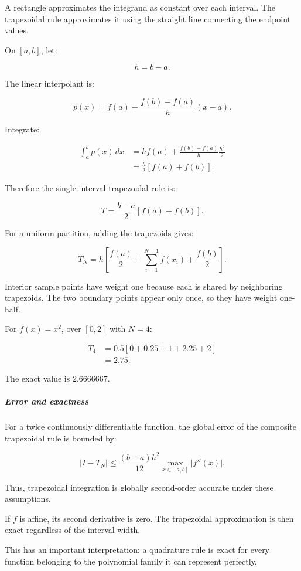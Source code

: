 A rectangle approximates the integrand as constant over each interval. The trapezoidal rule approximates it using the straight line connecting the endpoint values.

On \([a,b]\), let:

\[
h=b-a.
\]

The linear interpolant is:

\[
p(x)= f(a)+ \frac{f(b)-f(a)}h(x-a).
\]

Integrate:

\[
\begin{aligned} \int_a^b p(x)\,dx &=hf(a)+ \frac{f(b)-f(a)}h\frac{h^2}{2}\\ &=\frac h2[f(a)+f(b)]. \end{aligned}
\]

Therefore the single-interval trapezoidal rule is:

\[
\boxed{ T=\frac{b-a}{2}[f(a)+f(b)] }.
\]

For a uniform partition, adding the trapezoids gives:

\[
\boxed{ T_N= h\left[ \frac{f(a)}2+ \sum_{i=1}^{N-1}f(x_i)+ \frac{f(b)}2 \right] }.
\]

Interior sample points have weight one because each is shared by neighboring trapezoids. The two boundary points appear only once, so they have weight one-half.

For \(f(x)=x^2\), over \([0,2]\) with \(N=4\):

\[
\begin{aligned} T_4 &=0.5[ 0+0.25+1+2.25+2 ]\\ &=\boxed{2.75}. \end{aligned}
\]

The exact value is \(2.6666667\).

\subparagraph{Error and exactness}\label{error-and-exactness}

For a twice continuously differentiable function, the global error of the composite trapezoidal rule is bounded by:

\[
\boxed{ |I-T_N| \le \frac{(b-a)h^2}{12} \max_{x\in[a,b]}|f''(x)| }.
\]

Thus, trapezoidal integration is globally second-order accurate under these assumptions.

If \(f\) is affine, its second derivative is zero. The trapezoidal approximation is then exact regardless of the interval width.

This has an important interpretation: a quadrature rule is exact for every function belonging to the polynomial family it can represent perfectly.

